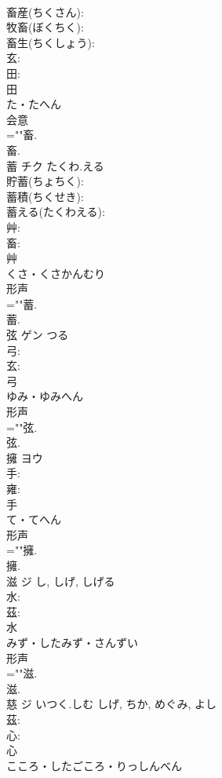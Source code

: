 \documentclass[8pt]{extreport}
\begin{document}
\begin{CJK}{UTF8}{min}
\\	畜産(ちくさん): 
\\	牧畜(ぼくちく): 
\\	畜生(ちくしょう): 
\\	玄: 
\\	田: 
\\	田	
\\	た・たへん	
\\	会意 
\\	=""畜.
\\	畜.
\\	蓄	チク	たくわ.える		
\\	貯蓄(ちょちく): 
\\	蓄積(ちくせき): 
\\	蓄える(たくわえる): 
\\	艸: 
\\	畜: 
\\	艸	
\\	くさ・くさかんむり	
\\	形声 
\\	=""蓄.
\\	蓄.
\\	弦	ゲン	つる		
\\	弓: 
\\	玄: 
\\	弓	
\\	ゆみ・ゆみへん	
\\	形声 
\\	=""弦.
\\	弦.
\\	擁	ヨウ			
\\	手: 
\\	雍: 
\\	手	
\\	て・てへん	
\\	形声 
\\	=""擁.
\\	擁.
\\	滋	ジ		し, しげ, しげる	
\\	水: 
\\	茲: 
\\	水	
\\	みず・したみず・さんずい	
\\	形声 
\\	=""滋.
\\	滋.
\\	慈	ジ	いつく.しむ	しげ, ちか, めぐみ, よし	
\\	茲: 
\\	心: 
\\	心	
\\	こころ・したごころ・りっしんべん	

\end{CJK}
\end{document}
